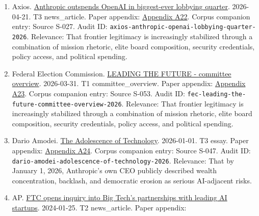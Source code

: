 \documentclass[
  american,
  11pt,
  letterpaper,
]{article}
\begin{document}
\begin{enumerate}
{  Government Intelligence and Defense Operations}. 2024-11-07. T1
  press\_release. Paper appendix:
  \hyperref[ch-10-appendix-a21-anthropic-and-palantir-partner-to-bring-claude-ai-models-to-aws-for-u-s-government-intelligence-and-defense-operations]{Appendix
  A21}. Corpus companion entry: Source S-098. Audit ID:
  \texttt{palantir-anthropic-aws-gov-partnership-2024}. Relevance: That
  by November 7, 2024 Anthropic model access for U.S. intelligence and
  defense agencies was being publicly distributed through a
  Palantir-plus-AWS stack.
\item
  Axios.
  \href{https://www.axios.com/2026/04/21/anthropic-outspends-openai-biggest-lobbying-quarter}{Anthropic
  outspends OpenAI in biggest-ever lobbying quarter}. 2026-04-21. T3
  news\_article. Paper appendix:
  \hyperref[ch-10-appendix-a22-anthropic-outspends-openai-in-biggest-ever-lobbying-quarter]{Appendix
  A22}. Corpus companion entry: Source S-027. Audit ID:
  \texttt{axios-anthropic-openai-lobbying-quarter-2026}. Relevance: That
  frontier legitimacy is increasingly stabilized through a combination
  of mission rhetoric, elite board composition, security credentials,
  policy access, and political spending.
\item
  Federal Election Commission.
  \href{https://www.fec.gov/data/committee/C00916114/}{LEADING THE
  FUTURE - committee overview}. 2026-03-31. T1 committee\_overview.
  Paper appendix:
  \hyperref[ch-10-appendix-a23-leading-the-future-committee-overview]{Appendix
  A23}. Corpus companion entry: Source S-053. Audit ID:
  \texttt{fec-leading-the-future-committee-overview-2026}. Relevance:
  That frontier legitimacy is increasingly stabilized through a
  combination of mission rhetoric, elite board composition, security
  credentials, policy access, and political spending.
\item
  Dario Amodei.
  \href{https://darioamodei.com/essay/the-adolescence-of-technology}{The
  Adolescence of Technology}. 2026-01-01. T3 essay. Paper appendix:
  \hyperref[ch-10-appendix-a24-the-adolescence-of-technology]{Appendix
  A24}. Corpus companion entry: Source S-047. Audit ID:
  \texttt{dario-amodei-adolescence-of-technology-2026}. Relevance: That
  by January 1, 2026, Anthropic's own CEO publicly described wealth
  concentration, backlash, and democratic erosion as serious AI-adjacent
  risks.
\item
  AP.
  \href{https://apnews.com/article/67feef411ef311f0be543f546ef34b3d}{FTC
  opens inquiry into Big Tech's partnerships with leading AI startups}.
  2024-01-25. T2 news\_article. Paper appendix:

\end{enumerate}
\end{document}
